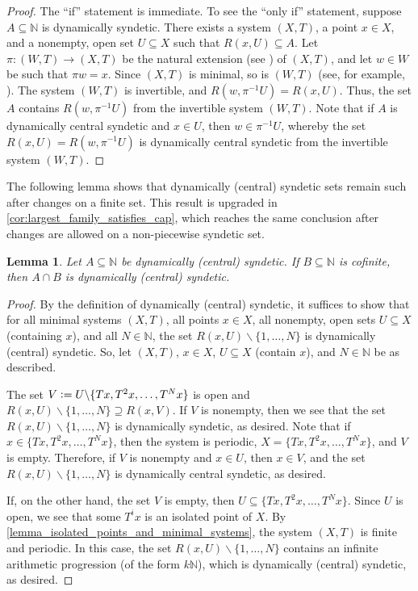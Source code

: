 \documentclass[letter,11pt]{article}
\theoremstyle{plain}
\newtheorem{lemma}[theorem]{Lemma}
\theoremstyle{definition}
\theoremstyle{plain}
\theoremstyle{plain}
\numberwithin{equation}{section}
\newcommand{\N}{\mathbb{N}}
\newcommand{\defeq}{\vcentcolon=}
\renewcommand{\setminus}{\backslash}
\begin{document}
\begin{proof}
    The ``if'' statement is immediate.  To see the ``only if'' statement, suppose $A \subseteq \N$ is dynamically syndetic.  There exists a system $(X,T)$, a point $x \in X$, and a nonempty, open set $U \subseteq X$ such that $R(x,U) \subseteq A$.  Let $\pi: (W,T) \to (X,T)$ be the natural extension (see \cite[Definition 6.8.10]{downarowiczbook}) of $(X,T)$, and let $w \in W$ be such that $\pi w = x$. Since $(X,T)$ is minimal, so is $(W,T)$ (see, for example, \cite[Lemma 2.9]{glasscock_koutsogiannis_richter_2019}). The system $(W,T)$ is invertible, and $R(w,\pi^{-1} U) = R(x,U)$.  Thus, the set $A$ contains $R(w,\pi^{-1} U)$ from the invertible system $(W,T)$.  Note that if $A$ is dynamically central syndetic and $x \in U$, then $w \in \pi^{-1} U$, whereby the set $R(x,U) = R(w,\pi^{-1} U)$ is dynamically central syndetic from the invertible system $(W,T)$.
\end{proof}

The following lemma shows that dynamically (central) syndetic sets remain such after changes on a finite set.  This result is upgraded in \cref{cor:largest_family_satisfies_cap}, which reaches the same conclusion after changes are allowed on a non-piecewise syndetic set.

\begin{lemma}
    \label{lemma_ds_dcs_modifyable_on_a_finite_set}
    Let $A \subseteq \N$ be dynamically (central) syndetic.  If $B \subseteq \N$ is cofinite, then $A \cap B$ is dynamically (central) syndetic.
\end{lemma}

\begin{proof}
    By the definition of dynamically (central) syndetic, it suffices to show that for all minimal systems $(X,T)$, all points $x \in X$, all nonempty, open sets $U \subseteq X$ (containing $x$), and all $N \in \N$, the set $R(x,U) \setminus \{1, \ldots, N\}$ is dynamically (central) syndetic.  So, let $(X,T)$, $x \in X$, $U \subseteq X$ (contain $x$), and $N \in \N$ be as described.

    The set $V \defeq U \setminus \{Tx, T^2x, \ldots, T^N x\}$ is open and $R(x,U) \setminus \{1, \ldots, N\} \supseteq R(x, V)$.  If $V$ is nonempty, then we see that the set $R(x,U) \setminus \{1, \ldots, N\}$ is dynamically syndetic, as desired. Note that if $x \in \{Tx, T^2x, \ldots, T^N x\}$, then the system is periodic, $X = \{Tx, T^2x, \ldots, T^N x\}$, and $V$ is empty.  Therefore, if $V$ is nonempty and $x \in U$, then $x \in V$, and the set $R(x,U) \setminus \{1, \ldots, N\}$ is dynamically central syndetic, as desired.

    If, on the other hand, the set $V$ is empty, then $U \subseteq \{Tx, T^2x, \ldots, T^N x\}$.  Since $U$ is open, we see that some $T^i x$ is an isolated point of $X$.  By \cref{lemma_isolated_points_and_minimal_systems}, the system $(X,T)$ is finite and periodic.  In this case, the set $R(x,U) \setminus \{1, \ldots, N\}$ contains an infinite arithmetic progression (of the form $k \N$), which is dynamically (central) syndetic, as desired.
\end{proof}
\end{document}
